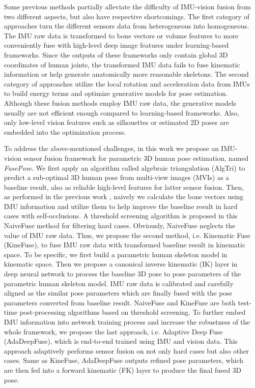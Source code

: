 \documentclass[lettersize,journal]{IEEEtran}
\begin{document}
Some previous methods partially alleviate the difficulty of IMU-vision fusion from two different aspects, but also have respective shortcomings. The first category of approaches \cite{zhang2020fusing,huang2020deepfuse} turn the different sensors data from heterogeneous into homogeneous. The IMU raw data is transformed to bone vectors \cite{zhang2020fusing} or volume features \cite{huang2020deepfuse} to more conveniently fuse with high-level deep image features under learning-based frameworks. Since the outputs of these frameworks only contain global 3D coordinates of human joints, the transformed IMU data fails to fuse kinematic information or help generate anatomically more reasonable skeletons. The second category of approaches \cite{gilbert2019fusing,von2016human} utilize the local rotation and acceleration data from IMUs to build energy terms and optimize generative models for pose estimation. Although these fusion methods employ IMU raw data, the generative models usually are not efficient enough compared to learning-based frameworks. Also, only low-level vision features such as silhouettes or estimated 2D poses are embedded into the optimization process.

To address the above-mentioned challenges, in this work we propose an IMU-vision sensor fusion framework for parametric 3D human pose estimation, named \emph{FusePose}. We first apply an algorithm called algebraic triangulation (AlgTri) \cite{iskakov2019learnable} to predict a sub-optimal 3D human pose from multi-view images (MVIs) as a baseline result, also as reliable high-level features for latter sensor fusion. Then, as performed in the previous work \cite{zhang2020fusing}, naively we calculate the bone vectors using IMU information and utilize them to help improve the baseline result in hard cases with self-occlusions. A threshold screening algorithm is proposed in this NaiveFuse method for filtering hard cases. Obviously, NaiveFuse neglects the value of IMU raw data. Thus, we propose the second method, i.e. Kinematic Fuse (KineFuse), to fuse IMU raw data with transformed baseline result in kinematic space. To be specific, we first build a parametric human skeleton model in kinematic space. Then we propose a canonical inverse kinematic (IK) layer in deep neural network to process the baseline 3D pose to pose parameters of the parametric human skeleton model. IMU raw data is calibrated and carefully aligned as the similar pose parameters which are finally fused with the pose parameters converted from baseline result. NaiveFuse and KineFuse are both test-time post-processing algorithms based on threshold screening. To further embed IMU information into network training process and increase the robustness of the whole framework, we propose the last approach, i.e. Adaptive Deep Fuse (AdaDeepFuse), which is end-to-end trained using IMU and vision data. This approach adaptively performs sensor fusion on not only hard cases but also other cases. Same as KineFuse, AdaDeepFuse outputs refined pose parameters, which are then fed into a forward kinematic (FK) layer to produce the final fused 3D pose. 
\end{document}
